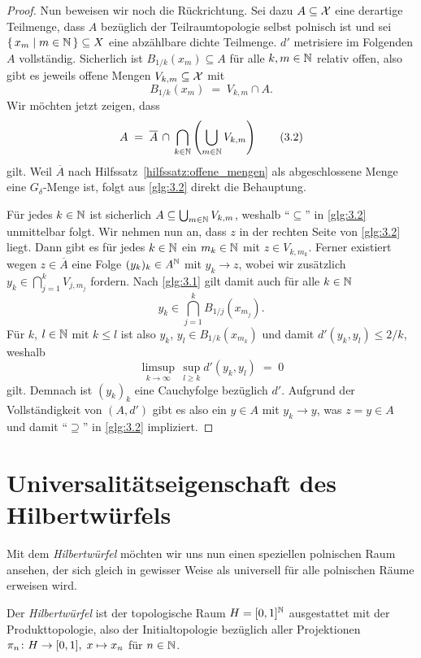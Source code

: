 \documentclass[../thesis/thesis.tex]{subfiles}
\begin{document}
\begin{proof}
		Nun beweisen wir noch die Rückrichtung. Sei dazu $A \subseteq \mathcal{X}$ eine derartige Teilmenge, dass
		$A$ bezüglich der Teilraumtopologie selbst polnisch ist und sei $\left\{\, x_m \; \middle| \; m \in \mathbb{N} \,\right\} \subseteq X$ eine abzählbare dichte Teilmenge. 
		$d'$ metrisiere im Folgenden 
		$A$ vollständig.
		Sicherlich ist $B_{1/k}(x_m) \subseteq A$ für alle 
		$k, m \in \mathbb{N}$ relativ offen, also gibt es jeweils offene Mengen 
		$V_{k, m} \subseteq \mathcal{X}$ mit
		\[ B_{1/k}(x_m) \; = \; V_{k, m} 
		\cap A \text{.} \label{glg:3.1} \tag{3.1}\]
		Wir möchten jetzt zeigen, dass
		\[ A \; = \; \overline{A} \, \cap \, 
		\bigcap_{k \in \mathbb{N}} \left( \bigcup_{m \in \mathbb{N}} V_{k, m} \right) 
		\label{glg:3.2} \tag{3.2}\]
		gilt. 
		Weil $\overline{A}$ nach Hilfssatz~\ref{hilfssatz:offene_mengen} 
		als abgeschlossene Menge eine $G_\delta$-Menge ist, 
		folgt aus \eqref{glg:3.2} direkt die Behauptung.
		
		Für jedes $k \in \mathbb{N}$ ist sicherlich $A \subseteq 
		\bigcup_{m \in \mathbb{N}} V_{k, m}$, weshalb \enquote{$\subseteq$} 
		in \eqref{glg:3.2} unmittelbar folgt.
		Wir nehmen nun an, dass $z$ in der rechten Seite von \eqref{glg:3.2} liegt. 
		Dann gibt es für jedes $k \in \mathbb{N}$ ein $m_k \in \mathbb{N}$ mit $z \in V_{k, m_k}$. 
		Ferner existiert wegen $z \in \overline{A}$ eine Folge $(y_k)_k \in A^{\mathbb{N}}$ 
		mit $y_k \to z$, wobei wir zusätzlich
		$y_k \in \bigcap_{j=1}^{k} V_{j, m_j}$
		fordern. Nach \eqref{glg:3.1} gilt damit auch für alle $k \in \mathbb{N}$
		\[y_k \in \bigcap_{j=1}^{k} B_{1/j}(x_{m_j}) \text{.} \]
		Für $k$, $l \in \mathbb{N}$ mit $k \leq l$ ist also $y_k$, $y_l \in B_{1/k}(x_{m_k})$ und damit $d'(y_k, y_l) \leq 2/k$, weshalb 
		\[ \limsup_{k \to \infty} \, \sup_{l \geq k} d'(y_k, y_l) \; = \; 0 \]
		gilt. Demnach ist $(y_k)_k$ eine Cauchyfolge bezüglich $d'$. Aufgrund der Vollständigkeit von 
		$(A, d')$ gibt es also ein $y \in A$ mit $y_k \to y$, was 
		$z = y \in A$ und damit \enquote{$\supseteq$} 
		in \eqref{glg:3.2} impliziert.
	\end{proof}

	\section{Universalitätseigenschaft des Hilbertwürfels}
	
	Mit dem \emph{Hilbertwürfel} möchten wir uns nun einen speziellen polnischen Raum ansehen, 
	der sich gleich in gewisser Weise als universell für alle polnischen Räume erweisen wird.
	
	\begin{Definition}[Hilbertwürfel]
		Der \emph{Hilbertwürfel} ist der topologische Raum $H = [0, 1]^{\mathbb{N}}$ 
		ausgestattet mit der Produkttopologie, also der Initialtopologie bezüglich 
		aller Projektionen $\pi_n \colon H \to [0, 1], \; x \mapsto x_n $ für $n \in \mathbb{N}$.
	\end{Definition}
	
\end{document}
